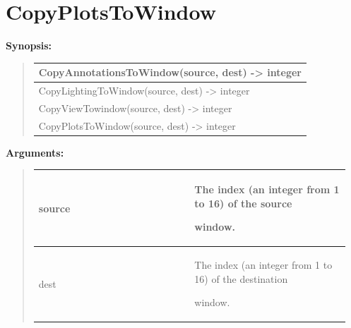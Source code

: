 \documentclass[letterpaper,10pt,english]{sphinxmanual}
\begin{document}
\section{CopyPlotsToWindow}
\label{functions:copyplotstowindow}
\begin{DUlineblock}{0em}
\item[] \textbf{Synopsis:}
\end{DUlineblock}
\begin{quote}

\begin{tabulary}{\linewidth}{|L|}
\hline

CopyAnnotationsToWindow(source, dest) -\textgreater{} integer
\\
\hline
CopyLightingToWindow(source, dest) -\textgreater{} integer
\\
\hline
CopyViewTowindow(source, dest) -\textgreater{} integer
\\
\hline
CopyPlotsToWindow(source, dest) -\textgreater{} integer
\\
\hline\end{tabulary}

\end{quote}

\begin{DUlineblock}{0em}
\item[] 
\item[] \textbf{Arguments:}
\end{DUlineblock}
\begin{quote}

\begin{tabular}{|p{0.475\linewidth}|p{0.475\linewidth}|}
\hline

source
 & 
\begin{DUlineblock}{0em}
\item[] The index (an integer from 1 to 16) of the source
\item[] window.
\end{DUlineblock}
\\
\hline
dest
 & 
\begin{DUlineblock}{0em}
\item[] The index (an integer from 1 to 16) of the destination
\item[] window.
\end{DUlineblock}
\\
\hline\end{tabular}

\end{quote}
\end{document}
